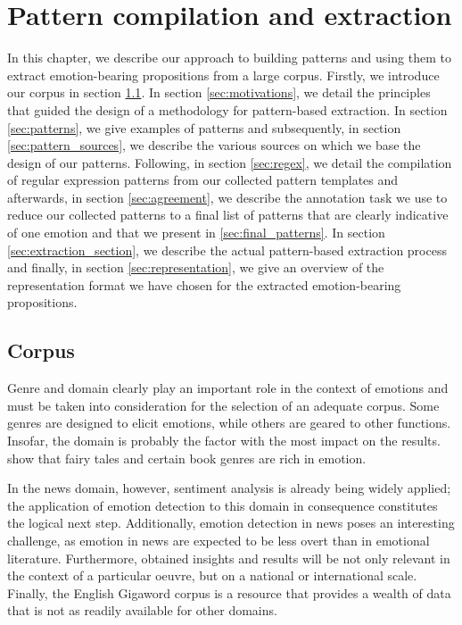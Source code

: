 
\chapter{Pattern compilation and extraction}

\label{ch:pattern_chapter}

In this chapter, we describe our approach to building patterns and using them to extract emotion-bearing propositions from a large corpus. Firstly, we introduce our corpus in section \ref{sec:corpus_selection}. In section \ref{sec:motivations}, we detail the principles that guided the design of a methodology for pattern-based extraction. In section \ref{sec:patterns}, we give examples of patterns and subsequently, in section \ref{sec:pattern_sources}, we describe the various sources on which we base the design of our patterns. Following, in section \ref{sec:regex}, we detail the compilation of regular expression patterns from our collected pattern templates and afterwards, in section \ref{sec:agreement}, we describe the annotation task we use to reduce our collected patterns to a final list of patterns that are clearly indicative of one emotion and that we present in \ref{sec:final_patterns}. In section \ref{sec:extraction_section}, we describe the actual pattern-based extraction process and finally, in section \ref{sec:representation}, we give an overview of the representation format we have chosen for the extracted emotion-bearing propositions.

\section{Corpus} \label{sec:corpus_selection}

Genre and domain clearly play an important role in the context of emotions and must be taken into consideration for the selection of an adequate corpus. Some genres are designed to elicit emotions, while others are geared to other functions. Insofar, the domain is probably the factor with the most impact on the results. \citeauthor{emotions_novels_fairy_tales} show that fairy tales and certain book genres are rich in emotion.

In the news domain, however, sentiment analysis is already being widely applied; the application of emotion detection to this domain in consequence constitutes the logical next step. Additionally, emotion detection in news poses an interesting challenge, as emotion in news are expected to be less overt than in emotional literature. Furthermore, obtained insights and results will be not only relevant in the context of a particular oeuvre, but on a national or international scale. Finally, the English Gigaword corpus is a resource that provides a wealth of data that is not as readily available for other domains.

